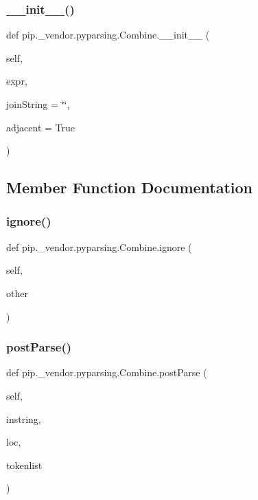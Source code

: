 \subsubsection{\texorpdfstring{\+\_\+\+\_\+init\+\_\+\+\_\+()}{\_\_init\_\_()}}
{\footnotesize\ttfamily def pip.\+\_\+vendor.\+pyparsing.\+Combine.\+\_\+\+\_\+init\+\_\+\+\_\+ (\begin{DoxyParamCaption}\item[{}]{self,  }\item[{}]{expr,  }\item[{}]{join\+String = {\ttfamily \char`\"{}\char`\"{}},  }\item[{}]{adjacent = {\ttfamily True} }\end{DoxyParamCaption})}



\subsection{Member Function Documentation}
\mbox{\label{classpip_1_1__vendor_1_1pyparsing_1_1Combine_a52c285338d1dcd3aa52ea876620d1053}} 
\subsubsection{\texorpdfstring{ignore()}{ignore()}}
{\footnotesize\ttfamily def pip.\+\_\+vendor.\+pyparsing.\+Combine.\+ignore (\begin{DoxyParamCaption}\item[{}]{self,  }\item[{}]{other }\end{DoxyParamCaption})}

\mbox{\label{classpip_1_1__vendor_1_1pyparsing_1_1Combine_a4f8026a744fafdc7fda560220b27aabe}} 
\subsubsection{\texorpdfstring{post\+Parse()}{postParse()}}
{\footnotesize\ttfamily def pip.\+\_\+vendor.\+pyparsing.\+Combine.\+post\+Parse (\begin{DoxyParamCaption}\item[{}]{self,  }\item[{}]{instring,  }\item[{}]{loc,  }\item[{}]{tokenlist }\end{DoxyParamCaption})}



